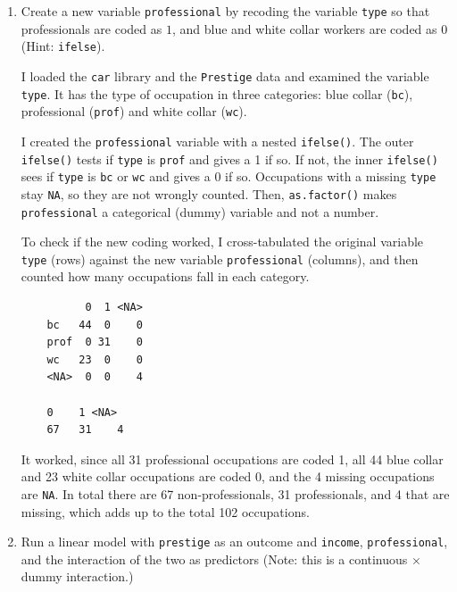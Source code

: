 \documentclass[12pt,letterpaper]{article}
\begin{document}
	\newpage
	\begin{enumerate}
		
		\item [(a)]
		Create a new variable \texttt{professional} by recoding the variable \texttt{type} so that professionals are coded as $1$, and blue and white collar workers are coded as $0$ (Hint: \texttt{ifelse}).
		\vspace{.25cm}
		
		\noindent I loaded the \texttt{car} library and the \texttt{Prestige} data and examined the variable \texttt{type}. It has the type of occupation in three categories: blue collar (\texttt{bc}), professional (\texttt{prof}) and white collar (\texttt{wc}).
		
		\noindent I created the \texttt{professional} variable with a nested \texttt{ifelse()}. The outer \texttt{ifelse()} tests if \texttt{type} is \texttt{prof} and gives a 1 if so. If not, the inner \texttt{ifelse()} sees if \texttt{type} is \texttt{bc} or \texttt{wc} and gives a 0 if so. Occupations with a missing \texttt{type} stay \texttt{NA}, so they are not wrongly counted. Then, \texttt{as.factor()} makes \texttt{professional} a categorical (dummy) variable and not a number. 
		
		
		
		\vspace{.25cm}
		\noindent To check if the new coding worked, I cross-tabulated the original variable \texttt{type} (rows) against the new variable \texttt{professional} (columns), and then counted how many occupations fall in each category.
		
\begin{verbatim}
	      0  1 <NA>
	bc   44  0    0
	prof  0 31    0
	wc   23  0    0
	<NA>  0  0    4
	
	0    1 <NA> 
	67   31    4 
\end{verbatim}
		
		\noindent It worked, since all 31 professional occupations are coded 1, all 44 blue collar and 23 white collar occupations are coded 0, and the 4 missing occupations are \texttt{NA}. In total there are 67 non-professionals, 31 professionals, and 4 that are missing, which adds up to the total 102 occupations.
		\vspace{1cm}
		\item [(b)]
		Run a linear model with \texttt{prestige} as an outcome and \texttt{income}, \texttt{professional}, and the interaction of the two as predictors (Note: this is a continuous $\times$ dummy interaction.)
		

\end{enumerate}
\end{document}
